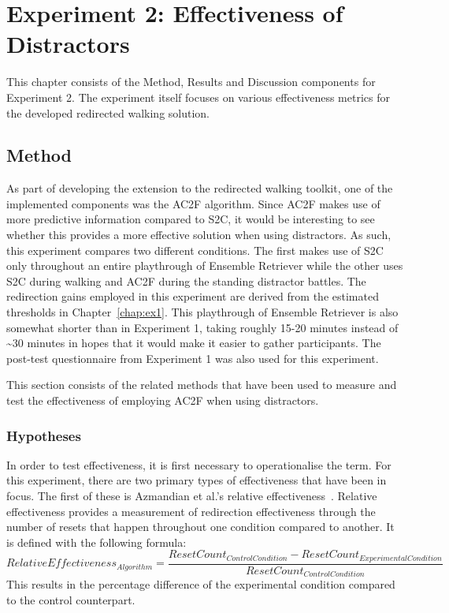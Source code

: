 \chapter{Experiment 2: Effectiveness of Distractors}\label{chap:ex2}
This chapter consists of the Method, Results and Discussion components for Experiment 2. The experiment itself focuses on various effectiveness metrics for the developed redirected walking solution. 

\section{Method}
As part of developing the extension to the redirected walking toolkit, one of the implemented components was the AC2F algorithm. Since AC2F makes use of more predictive information compared to S2C, it would be interesting to see whether this provides a more effective solution when using distractors. As such, this experiment compares two different conditions. The first makes use of S2C only throughout an entire playthrough of Ensemble Retriever while the other uses S2C during walking and AC2F during the standing distractor battles. The redirection gains employed in this experiment are derived from the estimated thresholds in Chapter~\ref{chap:ex1}. This playthrough of Ensemble Retriever is also somewhat shorter than in Experiment 1, taking roughly 15-20 minutes instead of \textasciitilde30 minutes in hopes that it would make it easier to gather participants. The post-test questionnaire from Experiment 1 was also used for this experiment. 

This section consists of the related methods that have been used to measure and test the effectiveness of employing AC2F when using distractors. 

\subsection{Hypotheses}
In order to test effectiveness, it is first necessary to operationalise the term. For this experiment, there are two primary types of effectiveness that have been in focus. The first of these is Azmandian et al.'s relative effectiveness~\cite{azmandian2015physical}. Relative effectiveness provides a measurement of redirection effectiveness through the number of resets that happen throughout one condition compared to another. It is defined with the following formula:
$$
RelativeEffectiveness_{Algorithm} = \frac{ResetCount_{ControlCondition} - ResetCount_{ExperimentalCondition}}{ResetCount_{ControlCondition}}
$$
This results in the percentage difference of the experimental condition compared to the control counterpart. 

